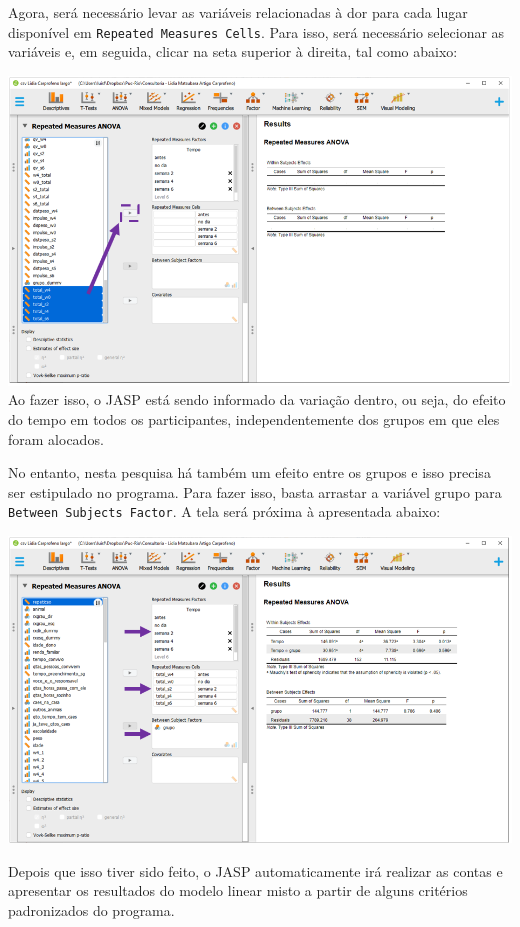 \documentclass[
]{book}
\begin{document}
Agora, será necessário levar as variáveis relacionadas à dor para cada
lugar disponível em \texttt{Repeated\ Measures\ Cells}. Para isso, será
necessário selecionar as variáveis e, em seguida, clicar na seta
superior à direita, tal como abaixo:

\includegraphics{./img/cap_anovarm_within.png} Ao fazer isso, o JASP
está sendo informado da variação dentro, ou seja, do efeito do tempo em
todos os participantes, independentemente dos grupos em que eles foram
alocados.

No entanto, nesta pesquisa há também um efeito entre os grupos e isso
precisa ser estipulado no programa. Para fazer isso, basta arrastar a
variável grupo para \texttt{Between\ Subjects\ Factor}. A tela será
próxima à apresentada abaixo:

\includegraphics{./img/cap_anovarm_resultados.png}

Depois que isso tiver sido feito, o JASP automaticamente irá realizar as
contas e apresentar os resultados do modelo linear misto a partir de
alguns critérios padronizados do programa.
\end{document}
